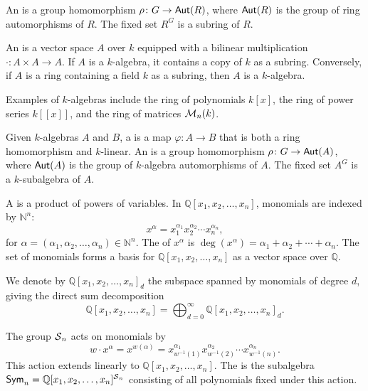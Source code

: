 An  is a group homomorphism \(\rho \colon G \to \operatorname{\mathsf{Aut}}(R)\), where \(\operatorname{\mathsf{Aut}}(R)\) is the group of ring automorphisms of \(R\). The fixed set \(R^G\) is a subring of \(R\).

An  is a vector space \(A\) over \(k\) equipped with a bilinear multiplication \(\cdot \colon A \times A \to A\). If \(A\) is a \(k\)-algebra, it contains a copy of \(k\) as a subring. Conversely, if \(A\) is a ring containing a field \(k\) as a subring, then \(A\) is a \(k\)-algebra.

Examples of \(k\)-algebras include the ring of polynomials \(k[x]\), the ring of power series \(k[[x]]\), and the ring of matrices \(\operatorname{\mathcal{M}}_n(k)\).

Given \(k\)-algebras \(A\) and \(B\), a  is a map \(\varphi \colon A \to B\) that is both a ring homomorphism and \(k\)-linear. An  is a group homomorphism \(\rho \colon G \to \operatorname{\mathsf{Aut}}(A)\), where \(\operatorname{\mathsf{Aut}}(A)\) is the group of \(k\)-algebra automorphisms of \(A\). The fixed set \(A^G\) is a \(k\)-subalgebra of \(A\).

A  is a product of powers of variables. In \(\mathbb{Q}[x_1, x_2, \ldots, x_n]\), monomials are indexed by \(\mathbb{N}^n\):
\[
    x^\alpha = x_1^{\alpha_1}x_2^{\alpha_2}\cdots x_n^{\alpha_n},
\]
for \(\alpha = (\alpha_1, \alpha_2, \ldots, \alpha_n) \in \mathbb{N}^n\). The  of \(x^\alpha\) is \(\deg(x^\alpha) = \alpha_1 + \alpha_2 + \cdots + \alpha_n\). The set of monomials forms a basis for \(\mathbb{Q}[x_1, x_2, \ldots, x_n]\) as a vector space over \(\mathbb{Q}\).

We denote by \(\mathbb{Q}[x_1, x_2, \ldots, x_n]_d\) the subspace spanned by monomials of degree \(d\), giving the direct sum decomposition
\[
    \mathbb{Q}[x_1, x_2, \ldots, x_n] = \bigoplus_{d=0}^\infty \mathbb{Q}[x_1, x_2, \ldots, x_n]_d.
\]

The group \(\operatorname{\mathcal{S}}_n\) acts on monomials by
\[
    w \cdot x^\alpha = x^{w(\alpha)} = x_{w^{-1}(1)}^{\alpha_1}x_{w^{-1}(2)}^{\alpha_2}\cdots x_{w^{-1}(n)}^{\alpha_n}.
\]
This action extends linearly to \(\mathbb{Q}[x_1, x_2, \ldots, x_n]\). The  is the subalgebra \(\operatorname{\mathsf{Sym}}_n = \mathbb{Q}[x_1, x_2, \ldots, x_n]^{\operatorname{\mathcal{S}}_n}\) consisting of all polynomials fixed under this action.
